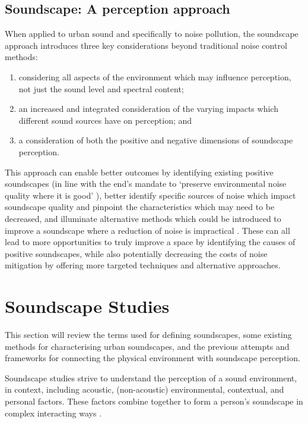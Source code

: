 \subsection{Soundscape: A perception approach}

When applied to urban sound and specifically to noise pollution, the soundscape approach introduces three key considerations beyond traditional noise control methods:

\begin{enumerate}
  \item considering all aspects of the environment which may influence perception, not just the sound level and spectral content;
  \item an increased and integrated consideration of the varying impacts which different sound sources have on perception; and
  \item a consideration of both the positive and negative dimensions of soundscape perception. 
\end{enumerate}

This approach can enable better outcomes by identifying existing positive soundscapes (in line with the \gls{end}'s mandate to `preserve environmental noise quality where it is good' \citep{Directive200249ECEuropeanUniEuropean}), better identify specific sources of noise which impact soundscape quality and pinpoint the characteristics which may need to be decreased, and illuminate alternative methods which could be introduced to improve a soundscape where a reduction of noise is impractical \citep{Kang2018Impact,Fiebig2018Does}. These can all lead to more opportunities to truly improve a space by identifying the causes of positive soundscapes, while also potentially decreasing the costs of noise mitigation by offering more targeted techniques and alternative approaches.


\section{Soundscape Studies}
This section will review the terms used for defining soundscapes, some existing methods for characterising urban soundscapes, and the previous attempts and frameworks for connecting the physical environment with soundscape perception.

Soundscape studies strive to understand the perception of a sound environment, in context, including acoustic, (non-acoustic) environmental, contextual, and personal factors. These factors combine together to form a person's soundscape in complex interacting ways \citep{Berglund2006Tool}.

